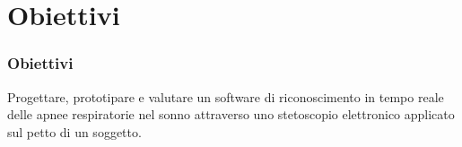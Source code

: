 \section{Obiettivi}
\begin{frame}
  \frametitle{Obiettivi}
    Progettare, prototipare e valutare un software di riconoscimento in tempo reale delle apnee respiratorie nel sonno attraverso uno stetoscopio elettronico applicato sul petto di un soggetto.
\end{frame}
    